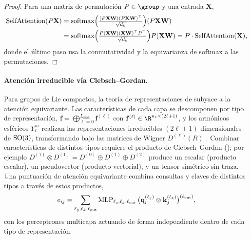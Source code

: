 \begin{proof}
Para una matriz de permutaci\'on $P \in \group$ y una entrada $\mathbf{X}$,
\begin{align}
  \text{SelfAttention}(P\mathbf{X})
  &= \operatorname{softmax}\!\Big(\tfrac{(P\mathbf{X}\mathbf{W})(P\mathbf{X}\mathbf{W})^\top}
     {\sqrt{d_k}}\Big)(P\mathbf{X}\mathbf{W}) \\
  &= \operatorname{softmax}\!\Big(\tfrac{P(\mathbf{X}\mathbf{W})(\mathbf{X}\mathbf{W})^\top
     P^\top}{\sqrt{d_k}}\Big)P(\mathbf{X}\mathbf{W})
   = P \cdot \text{SelfAttention}(\mathbf{X}),
\end{align}
donde el \'ultimo paso usa la conmutatividad y la equivarianza de softmax a las
permutaciones.
\end{proof}

\paragraph{Atenci\'on irreducible v\'ia Clebsch--Gordan.}
Para grupos de Lie compactos, la teor\'ia de representaciones de
 subyace a la atenci\'on equivariante. Las caracter\'isticas
de cada capa se descomponen por tipo de representaci\'on, $\mathbf{f} =
\bigoplus_{\ell=0}^{L_{\max}} \mathbf{f}^{(\ell)}$ con $\mathbf{f}^{(\ell)} \in
\R^{n_\ell \times (2\ell+1)}$, y los arm\'onicos esf\'ericos $Y_\ell^m$ realizan
las representaciones irreducibles $(2\ell+1)$-dimensionales de $\operatorname{SO}(3)$,
transformando bajo las matrices de Wigner $D^{(\ell)}(R)$
\citep{brocker1985representations}. Combinar caracter\'isticas de distintos tipos
requiere el producto de Clebsch--Gordan (); por
ejemplo $D^{(1)} \otimes D^{(1)} = D^{(0)} \oplus D^{(1)} \oplus D^{(2)}$ produce
un escalar (producto escalar), un pseudovector (producto vectorial), y un tensor
sim\'etrico sin traza. Una puntuaci\'on de atenci\'on equivariante combina
consultas y claves de distintos tipos a trav\'es de estos productos,
\begin{equation}
  e_{ij} = \sum_{\ell_q, \ell_k, \ell_{\text{out}}}
    \operatorname{MLP}_{\ell_q, \ell_k, \ell_{\text{out}}}
    \big(\mathbf{q}_i^{(\ell_q)} \otimes \mathbf{k}_j^{(\ell_k)}
    \big)^{(\ell_{\text{out}})},
\end{equation}
con los perceptrones multicapa actuando de forma independiente dentro de cada
tipo de representaci\'on.

